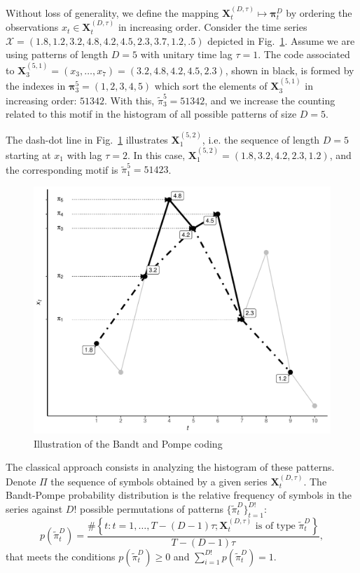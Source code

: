 \documentclass[paper=letter, fontsize=12pt]{article}
\begin{document}
	Without loss of generality, we define the mapping ${\mathbf X}_t^{(D,\tau)} \mapsto {\mathbf \pi}_t^{D}$ by ordering the observations $x_t \in {\mathbf X}_t^{(D,\tau)}$ in increasing order.
	Consider the time series $\mathcal X = (1.8, 1.2, 3.2, 4.8, 4.2, 4.5, 2.3, 3.7, 1.2, .5)$ depicted in Fig.~\ref{Fig:IntroBP}.
	Assume we are using patterns of length $D=5$ with unitary time lag $\tau=1$.
	The code associated to $\mathbf X_{3}^{(5,1)}=(x_3,\dots,x_7)=(3.2, 4.8, 4.2, 4.5, 2.3)$, shown in black, is formed by the indexes in $\bm\pi_3^{5}=(1,2,3,4,5)$ which sort the elements of $\mathbf X_{3}^{(5,1)}$ in increasing order: $51342$.
	With this, $\widetilde{\pi}_3^{5} = 51342$, and we increase the counting related to this motif in the histogram of all possible patterns of size $D=5$.
	
	The dash-dot line in Fig.~\ref{Fig:IntroBP} illustrates $\mathbf X_{1}^{(5,2)}$, i.e. the sequence of length $D=5$ starting at $x_1$ with lag $\tau=2$.
	In this case, $\mathbf X_{1}^{(5,2)}= (1.8, 3.2, 4.2, 2.3, 1.2)$, and the corresponding motif is $\widetilde{\pi}_1^{5}=51423$.
	
	\begin{figure}[hbt]
		\centering
		\includegraphics[width=.8\linewidth]{Figures/IntroBP}
		\caption{Illustration of the Bandt and Pompe coding\label{Fig:IntroBP}}
	\end{figure}
	
	The classical approach consists in analyzing the histogram of these patterns.
	Denote $\Pi$ the sequence of symbols obtained by a given series $\mathbf{X}_t^{(D,\tau)}$.
	The Bandt-Pompe probability distribution is the relative frequency of symbols in the series against $D!$ possible permutations of patterns $\{\widetilde\pi_t^D \}_{t = 1}^{D!}$:
	\begin{equation}
	p(\widetilde\pi_t^D) = \frac{\#\left \{t : t = 1, \dots, T-(D-1)\tau; \mathbf{X}_t^{(D,\tau)} \text{ is of type } \widetilde\pi_t^D\right \}}{T- (D-1)\tau},  
	\end{equation}
	that meets the conditions $p(\widetilde\pi_t^D) \ge 0$ and  $\sum_{i=1}^{D!} p(\widetilde\pi_t^D) = 1$.
	
\end{document}
